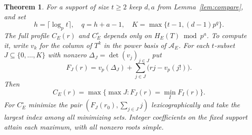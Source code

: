 \documentclass[11pt,letterpaper]{article}
\newtheorem{theorem}{Theorem}
\newcommand{\ord}{v_p}\newcommand{\ds}{s_p}
\begin{document}
\begin{theorem}\label{thm:finite}
For a support of size $t\ge2$ keep $d,a$ from Lemma~\ref{lem:compare}, and set
\[
 h=\lceil\log_p t\rceil,\quad q=h+a-1,\quad
 K=\max\{t-1,(d-1)p^q\}.
\]
The full profile $C_E(r)$ and $C_E^\circ$ depends only on $H_E(T)\bmod p^a$. To compute it, write $v_k$ for the column of $T^k$ in the power basis of $\mathcal A_E$. For each $t$-subset $J\subseteq\{0,\ldots,K\}$ with nonzero $\Delta_J=\det(v_j)_{j\in J}$ put
\[
 F_J(r)=\ord(\Delta_J)+\sum_{j\in J}\bigl(rj-\ord(j!)\bigr).
\]
Then
\[
 \boxed{\displaystyle C_E(r)=\max\{\max J:F_J(r)=\min_I F_I(r)\}.}
\]
For $C_E^\circ$ minimize the pair $(F_J(r_0),\sum_{j\in J}j)$ lexicographically and take the largest index among all minimizing sets. Integer coefficients on the fixed support attain each maximum, with all nonzero roots simple.
\end{theorem}
\end{document}
